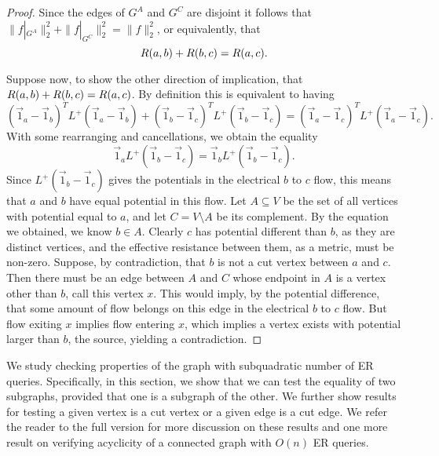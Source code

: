 {\begin{proof}
    Since the edges of $G^A$ and $G^C$ are disjoint it follows that $\|f|_{G^A}\|_2^2 + \|f|_{G^C}\|_2^2 = \|f\|_2^2$, or equivalently, that \[
        R(a,b) + R(b,c) = R(a,c).
    \]

    Suppose now, to show the other direction of implication, that $R(a,b) + R(b,c) = R(a,c)$.
    By definition this is equivalent to having
    \[
        (\Vec{1}_a - \Vec{1}_b)^T L^+ (\Vec{1}_a - \Vec{1}_b) + (\Vec{1}_b - \Vec{1}_c)^T L^+ (\Vec{1}_b - \Vec{1}_c) = (\Vec{1}_a - \Vec{1}_c)^T L^+ (\Vec{1}_a - \Vec{1}_c).
    \]
    With some rearranging and cancellations, we obtain the equality \[
        \Vec{1}_a L^+ (\Vec{1}_b - \Vec{1}_c) = \Vec{1}_b L^+ (\Vec{1}_b - \Vec{1}_c).
    \]
    Since $L^+ (\Vec{1}_b - \Vec{1}_c)$ gives the potentials in the electrical $b$ to $c$ flow, this means that $a$ and $b$ have equal potential in this flow.
    Let $A \subseteq V$ be the set of all vertices with potential equal to $a$, and let $C = V \setminus A$ be its complement.
    By the equation we obtained, we know $b \in A$.
    Clearly $c$ has potential different than $b$, as they are distinct vertices, and the effective resistance between them, as a metric, must be non-zero.
    Suppose, by contradiction, that $b$ is not a cut vertex between $a$ and $c$.
    Then there must be an edge between $A$ and $C$ whose endpoint in $A$ is a vertex other than $b$, call this vertex $x$.
    This would imply, by the potential difference, that some amount of flow belongs on this edge in the electrical $b$ to $c$ flow.
    But flow exiting $x$ implies flow entering $x$, which implies a vertex exists with potential larger than $b$, the source, yielding a contradiction.
\end{proof}
}
{We study checking properties of the graph with subquadratic number of ER queries.  Specifically, in this section, we show that we can test the equality of two subgraphs, provided that one is a subgraph of the other.  We further show results for testing a given vertex is a cut vertex or a given edge is a cut edge.  We refer the reader to the full version for more discussion on these results and one more result on verifying acyclicity of a connected graph with $O(n)$ ER queries.}

